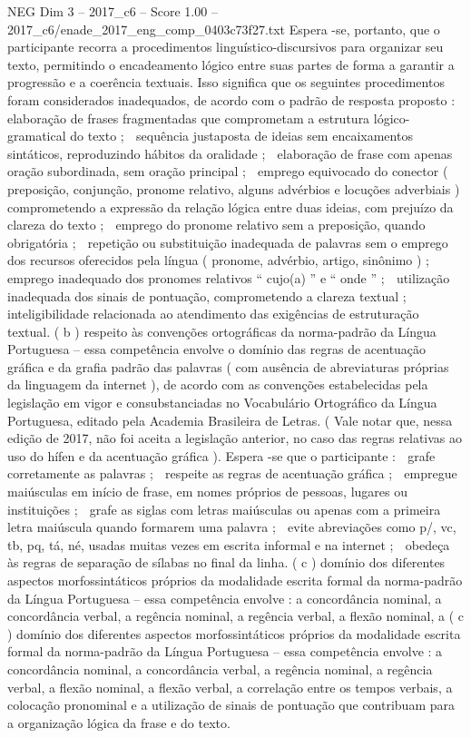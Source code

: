 \begin{textsample}{NEG Dim 3 – 2017\_c6 – Score 1.00 – 2017\_c6/enade\_2017\_eng\_comp\_0403c73f27.txt}
Espera -se, portanto, que o participante recorra a procedimentos linguístico-discursivos para organizar seu texto, permitindo o encadeamento lógico entre suas partes de forma a garantir a progressão e a coerência textuais.
Isso significa que os seguintes procedimentos foram considerados inadequados, de acordo com o padrão de resposta proposto :  elaboração de frases fragmentadas que comprometam a estrutura lógico-gramatical do texto ;  sequência justaposta de ideias sem encaixamentos sintáticos, reproduzindo hábitos da oralidade ;  elaboração de frase com apenas oração subordinada, sem oração principal ;  emprego equivocado do conector ( preposição, conjunção, pronome relativo, alguns advérbios e locuções adverbiais ) comprometendo a expressão da relação lógica entre duas ideias, com prejuízo da clareza do texto ;  emprego do pronome relativo sem a preposição, quando obrigatória ;  repetição ou substituição inadequada de palavras sem o emprego dos recursos oferecidos pela língua ( pronome, advérbio, artigo, sinônimo ) ;  emprego inadequado dos pronomes relativos “ cujo(a) ” e “ onde ” ;  utilização inadequada dos sinais de pontuação, comprometendo a clareza textual ;  inteligibilidade relacionada ao atendimento das exigências de estruturação textual. ( b ) respeito às convenções ortográficas da norma-padrão da Língua Portuguesa – essa competência envolve o domínio das regras de acentuação gráfica e da grafia padrão das palavras ( com ausência de abreviaturas próprias da linguagem da internet ), de acordo com as convenções estabelecidas pela legislação em vigor e consubstanciadas no Vocabulário Ortográfico da Língua Portuguesa, editado pela Academia Brasileira de Letras. ( Vale notar que, nessa edição de 2017, não foi aceita a legislação anterior, no caso das regras relativas ao uso do hífen e da acentuação gráfica ).
Espera -se que o participante :  grafe corretamente as palavras ;  respeite as regras de acentuação gráfica ;  empregue maiúsculas em início de frase, em nomes próprios de pessoas, lugares ou instituições ;  grafe as siglas com letras maiúsculas ou apenas com a primeira letra maiúscula quando formarem uma palavra ;  evite abreviações como p/, vc, tb, pq, tá, né, usadas muitas vezes em escrita informal e na internet ;  obedeça às regras de separação de sílabas no final da linha. ( c ) domínio dos diferentes aspectos morfossintáticos próprios da modalidade escrita formal da norma-padrão da Língua Portuguesa – essa competência envolve : a concordância nominal, a concordância verbal, a regência nominal, a regência verbal, a flexão nominal, a ( c ) domínio dos diferentes aspectos morfossintáticos próprios da modalidade escrita formal da norma-padrão da Língua Portuguesa – essa competência envolve : a concordância nominal, a concordância verbal, a regência nominal, a regência verbal, a flexão nominal, a flexão verbal, a correlação entre os tempos verbais, a colocação pronominal e a utilização de sinais de pontuação que contribuam para a organização lógica da frase e do texto.

\end{textsample}
